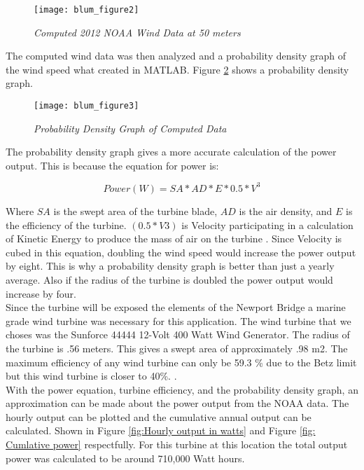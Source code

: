 \begin{figure}
\centering
\texttt{[image: blum\_figure2]}
\caption{\textit{Computed 2012 NOAA Wind Data at 50 meters}}
\label{fig:new_computed_wind_data}
\end{figure}


The computed wind data was then analyzed and a probability density graph of the wind speed what created in MATLAB. Figure \ref{fig:Probality_density_function} shows a probability density graph.



\begin{figure}
\centering
\texttt{[image: blum\_figure3]}
\caption{\textit{Probability Density Graph of Computed Data}}
\label{fig:Probality_density_function}
\end{figure}

The probability density graph gives a more accurate calculation of the power output. This is because the equation for power is: 

\begin{equation}
Power(W)={SA}*{AD}*{E}*{0.5}*{V^3}
\end{equation}

Where $SA$ is the swept area of the turbine blade, $AD$ is the air density, and $E$ is the efficiency of the turbine. $(0.5 * V3)$ is Velocity participating in a calculation of Kinetic Energy to produce the mass of air on the turbine \cite{ArcGIS2012}. Since Velocity is cubed in this equation, doubling the wind speed would increase the power output by eight. This is why a probability density graph is better than just a yearly average.  Also if the radius of the turbine is doubled the power output would increase by four.\\
\indent
Since the turbine will be exposed the elements of the Newport Bridge a marine grade wind turbine was necessary for this application. The wind turbine that we choses was the Sunforce 44444 12-Volt 400 Watt Wind Generator. The radius of the turbine is .56 meters. This gives a swept area of approximately .98 m2. The maximum efficiency of any wind turbine can only be 59.3 \% due to the Betz limit but this wind turbine is closer to 40\%. \cite{Windpower2008}.\\
\indent   
With the power equation, turbine efficiency, and the probability density graph, an approximation can be made about the power output from the NOAA data. The hourly output can be plotted and the cumulative annual output can be calculated. Shown in Figure \ref{fig:Hourly output in watts} and Figure \ref{fig: Cumlative power} respectfully. For this turbine at this location the total output power was calculated to be around 710,000 Watt hours. \\
\indent

